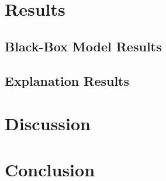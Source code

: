 \documentclass{article}
\begin{document}
	\section{Results}
		\subsection{Black-Box Model Results}
		\subsection{Explanation Results}
	\section{Discussion}
	\section{Conclusion}
	\newpage
	\sloppy
	\printbibliography
\end{document}
